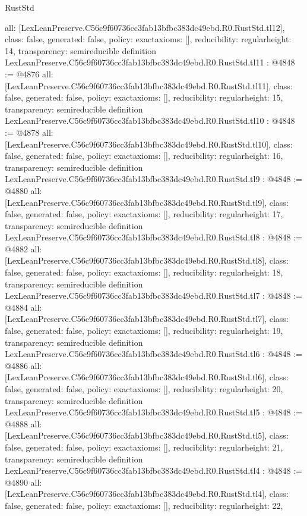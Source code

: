 \begin{lexlean}{RustStd}
\begin{coremodule}
{  all: [LexLeanPreserve.C56c9f60736cc3fab13bfbc383dc49ebd.R0.RustStd.tl12],
  class: false,
  generated: false,
  policy: exact{axioms: []},
  reducibility: regular{height: 14},
  transparency: semireducible
}
definition LexLeanPreserve.C56c9f60736cc3fab13bfbc383dc49ebd.R0.RustStd.tl11 : @4848 := @4876 {
  all: [LexLeanPreserve.C56c9f60736cc3fab13bfbc383dc49ebd.R0.RustStd.tl11],
  class: false,
  generated: false,
  policy: exact{axioms: []},
  reducibility: regular{height: 15},
  transparency: semireducible
}
definition LexLeanPreserve.C56c9f60736cc3fab13bfbc383dc49ebd.R0.RustStd.tl10 : @4848 := @4878 {
  all: [LexLeanPreserve.C56c9f60736cc3fab13bfbc383dc49ebd.R0.RustStd.tl10],
  class: false,
  generated: false,
  policy: exact{axioms: []},
  reducibility: regular{height: 16},
  transparency: semireducible
}
definition LexLeanPreserve.C56c9f60736cc3fab13bfbc383dc49ebd.R0.RustStd.tl9 : @4848 := @4880 {
  all: [LexLeanPreserve.C56c9f60736cc3fab13bfbc383dc49ebd.R0.RustStd.tl9],
  class: false,
  generated: false,
  policy: exact{axioms: []},
  reducibility: regular{height: 17},
  transparency: semireducible
}
definition LexLeanPreserve.C56c9f60736cc3fab13bfbc383dc49ebd.R0.RustStd.tl8 : @4848 := @4882 {
  all: [LexLeanPreserve.C56c9f60736cc3fab13bfbc383dc49ebd.R0.RustStd.tl8],
  class: false,
  generated: false,
  policy: exact{axioms: []},
  reducibility: regular{height: 18},
  transparency: semireducible
}
definition LexLeanPreserve.C56c9f60736cc3fab13bfbc383dc49ebd.R0.RustStd.tl7 : @4848 := @4884 {
  all: [LexLeanPreserve.C56c9f60736cc3fab13bfbc383dc49ebd.R0.RustStd.tl7],
  class: false,
  generated: false,
  policy: exact{axioms: []},
  reducibility: regular{height: 19},
  transparency: semireducible
}
definition LexLeanPreserve.C56c9f60736cc3fab13bfbc383dc49ebd.R0.RustStd.tl6 : @4848 := @4886 {
  all: [LexLeanPreserve.C56c9f60736cc3fab13bfbc383dc49ebd.R0.RustStd.tl6],
  class: false,
  generated: false,
  policy: exact{axioms: []},
  reducibility: regular{height: 20},
  transparency: semireducible
}
definition LexLeanPreserve.C56c9f60736cc3fab13bfbc383dc49ebd.R0.RustStd.tl5 : @4848 := @4888 {
  all: [LexLeanPreserve.C56c9f60736cc3fab13bfbc383dc49ebd.R0.RustStd.tl5],
  class: false,
  generated: false,
  policy: exact{axioms: []},
  reducibility: regular{height: 21},
  transparency: semireducible
}
definition LexLeanPreserve.C56c9f60736cc3fab13bfbc383dc49ebd.R0.RustStd.tl4 : @4848 := @4890 {
  all: [LexLeanPreserve.C56c9f60736cc3fab13bfbc383dc49ebd.R0.RustStd.tl4],
  class: false,
  generated: false,
  policy: exact{axioms: []},
  reducibility: regular{height: 22},
}
\end{coremodule}
\end{lexlean}
